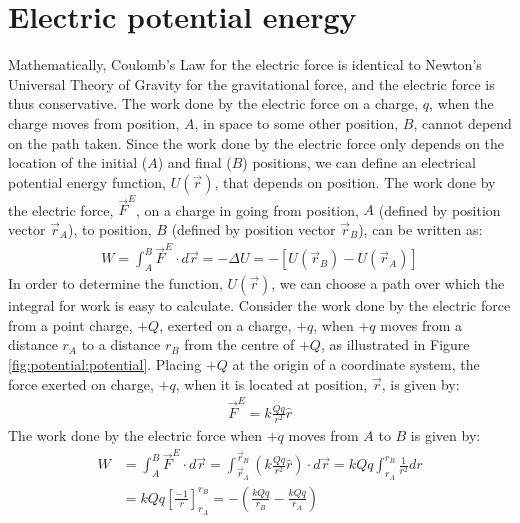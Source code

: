 \section{Electric potential energy}
\label{sec:potential:potentialdefinition}
Mathematically, Coulomb's Law for the electric force is identical to Newton's Universal Theory of Gravity for the gravitational force, and the electric force is thus conservative. The work done by the electric force on a charge, $q$, when the charge moves from position, $A$, in space to some other position, $B$, cannot depend on the path taken. Since the work done by the electric force only depends on the location of the initial ($A$) and final ($B$) positions, we can define an electrical potential energy function, $U(\vec r)$, that depends on position. The work done by the electric force, $\vec F^E$,  on a charge in going from position, $A$ (defined by position vector $\vec r_A$), to position, $B$ (defined by position vector $\vec r_B$), can be written as:
\begin{align}
\label{eqn:potential:potentialwork}
W=\int_A^B \vec F^E\cdot d\vec r=-\Delta U=-\left[ U(\vec r_B)-U(\vec r_A) \right]
\end{align}
In order to determine the function, $U(\vec r)$, we can choose a path over which the integral for work is easy to calculate. Consider the work done by the electric force from a point charge, $+Q$, exerted on a charge, $+q$, when $+q$ moves from a distance $r_A$ to a distance $r_B$ from the centre of $+Q$, as illustrated in Figure \ref{fig:potential:potential}.
Placing $+Q$ at the origin of a coordinate system, the force exerted on charge, $+q$, when it is located at position, $\vec r$, is given by:
\begin{align*}
\vec F^E=k\frac{Qq}{r^2}\hat r
\end{align*}
The work done by the electric force when $+q$ moves from $A$ to $B$ is given by:
\begin{align*}
W&=\int_A^B \vec F^E\cdot d\vec r=\int_{\vec r_A}^{\vec r_B} \left(k\frac{Qq}{r^2}\hat r\right)\cdot d\vec r=kQq \int_{r_A}^{r_B} \frac{1}{r^2}dr\\
&=kQq \left[\frac{-1}{r} \right]_{r_A}^{r_B}=-\left(\frac{kQq}{r_B}-\frac{kQq}{r_A}\right)
\end{align*}
